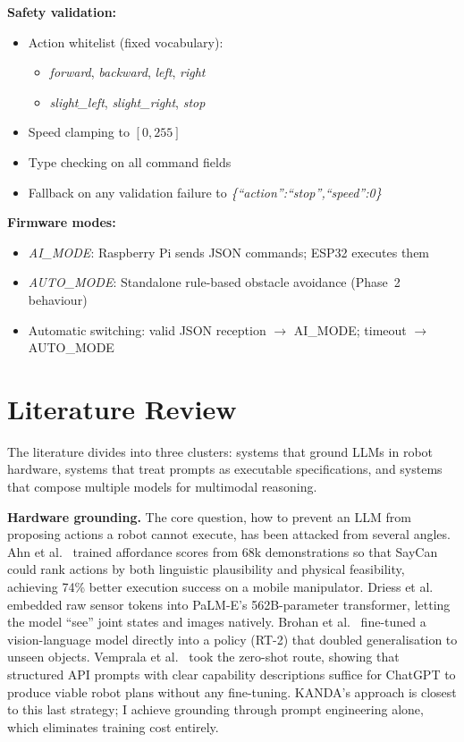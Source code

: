\newpage
\textbf{Safety validation:}
\begin{itemize}[nosep]
  \item Action whitelist (fixed vocabulary):
  \begin{itemize}[nosep,leftmargin=1.25em]
    \item \textit{forward}, \textit{backward}, \textit{left}, \textit{right}
    \item \textit{slight\_left}, \textit{slight\_right}, \textit{stop}
  \end{itemize}
  \item Speed clamping to $[0, 255]$
  \item Type checking on all command fields
  \item Fallback on any validation failure to \textit{\{``action'':``stop'',``speed'':0\}}
\end{itemize}

\textbf{Firmware modes:}
\begin{itemize}[nosep]
  \item \textit{AI\_MODE}: Raspberry Pi sends JSON commands; ESP32 executes them
  \item \textit{AUTO\_MODE}: Standalone rule-based obstacle avoidance (Phase~2 behaviour)
  \item Automatic switching: valid JSON reception $\rightarrow$ AI\_MODE; timeout $\rightarrow$ AUTO\_MODE
\end{itemize}

\section{Literature Review}
\label{sec:litreview}

The literature divides into three clusters: systems that ground LLMs in robot hardware, systems that treat prompts as executable specifications, and systems that compose multiple models for multimodal reasoning.

\textbf{Hardware grounding.} The core question, how to prevent an LLM from proposing actions a robot cannot execute, has been attacked from several angles. Ahn et al.~\cite{ahn2022saycan} trained affordance scores from 68k demonstrations so that SayCan could rank actions by both linguistic plausibility and physical feasibility, achieving 74\% better execution success on a mobile manipulator. Driess et al.~\cite{driess2023palme} embedded raw sensor tokens into PaLM-E's 562B-parameter transformer, letting the model ``see'' joint states and images natively. Brohan et al.~\cite{brohan2023rt2} fine-tuned a vision-language model directly into a policy (RT-2) that doubled generalisation to unseen objects. Vemprala et al.~\cite{vemprala2024chatgpt} took the zero-shot route, showing that structured API prompts with clear capability descriptions suffice for ChatGPT to produce viable robot plans without any fine-tuning. KANDA's approach is closest to this last strategy; I achieve grounding through prompt engineering alone, which eliminates training cost entirely.

